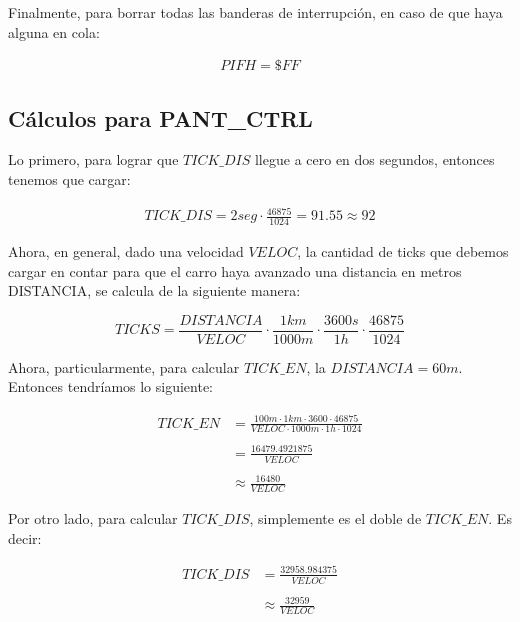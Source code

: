 \documentclass[12pt,letterpaper]{report} %
\begin{document}
Finalmente, para borrar todas las banderas de interrupción, en caso de que haya alguna en cola:

\begin{align*}
    PIFH = \$FF
\end{align*}

\subsection{Cálculos para PANT\_CTRL}
Lo primero, para lograr que $TICK\_DIS$ llegue a cero en dos segundos, entonces tenemos que cargar:

\begin{align*}
    TICK\_DIS = 2seg \cdot \frac{46875}{1024} = 91.55 \approx 92
\end{align*}

Ahora, en general, dado una velocidad $VELOC$, la cantidad de ticks que debemos cargar en  contar para que el carro haya avanzado una distancia en metros DISTANCIA, se calcula de la siguiente manera:

\begin{equation}
    TICKS = \frac{DISTANCIA}{VELOC} \cdot \frac{1km}{1000m} \cdot \frac{3600s}{1h} \cdot \frac{46875}{1024}
\end{equation}

Ahora, particularmente, para calcular $TICK\_EN$, la $DISTANCIA = 60m$. Entonces tendríamos lo siguiente:

\begin{align*}
    TICK\_EN &= \frac{100m \cdot 1km \cdot 3600 \cdot 46875}{VELOC \cdot 1000m \cdot 1h \cdot 1024} \\ \\
             &= \frac{16479.4921875}{VELOC} \\ \\ 
             &\approx \frac{16480}{VELOC}
\end{align*}

Por otro lado, para calcular $TICK\_DIS$, simplemente es el doble de $TICK\_EN$. Es decir:

\begin{align*}
    TICK\_DIS &= \frac{32958.984375}{VELOC} \\ \\
              &\approx \frac{32959}{VELOC}
\end{align*}
\end{document}
